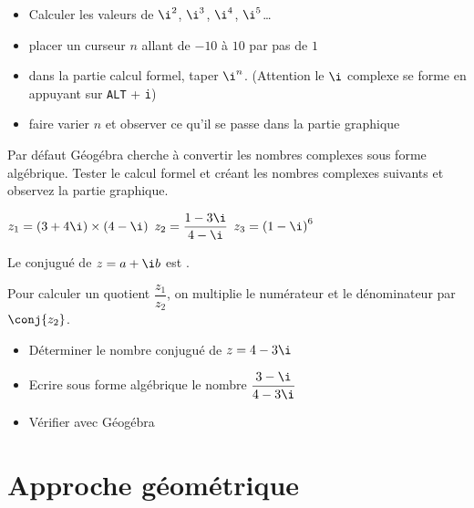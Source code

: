 \begin{exercice_cours}[Calcul de $\i^n$]
	\begin{itemize}
		\item Calculer les valeurs de $\i^2$, $\i^3$, $\i^4$, $\i^5$\ldots
			\item placer un curseur $n$ allant de $-10$ à $10$ par pas de $1$
			\item dans la partie calcul formel, taper $\i^n$. (Attention le $\i$ complexe se forme en appuyant sur \verb|ALT| + \verb|i|)
			\item faire varier $n$ et observer ce qu'il se passe dans la partie graphique
	\end{itemize}
\end{exercice_cours}


\begin{exercice_cours}
	Par défaut Géogébra cherche à convertir les nombres complexes sous forme algébrique. Tester le calcul formel et créant les nombres complexes suivants et observez la partie graphique.

	$z_1 = (3+4\i) \times (4-\i)$ \hfill 
	$z_2=\dfrac{1-3\i}{4-\i}$ \hfill
	$z_3={(1-\i)}^6$ \hfill
	\hspace{3cm}
\end{exercice_cours}


\begin{propriete}
	Le conjugué de $z=a+\i b$ est .
\end{propriete}

\begin{methode}

	Pour calculer un quotient $\dfrac{z_1}{z_2}$, on multiplie le numérateur et le dénominateur par $\conj{z_2}$.
	\end{methode}
\begin{exercice_cours}[Application]
	\begin{itemize}
		\item Déterminer le nombre conjugué de $z=4-3\i$
		\item Ecrire sous forme algébrique le nombre $\dfrac{3-\i}{4-3\i}$
		\item Vérifier avec Géogébra
	\end{itemize}
\end{exercice_cours}


\section{Approche géométrique}

